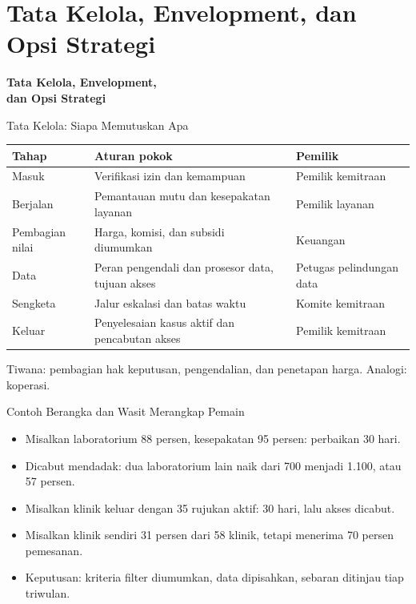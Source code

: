 \documentclass[aspectratio=169, table, 12pt]{beamer}
\begin{document}
\section{Tata Kelola, Envelopment, dan Opsi Strategi}

\begin{frame}{\hfill}
  \centering
  \Huge{\textbf{Tata Kelola, Envelopment,\\dan Opsi Strategi}}
\end{frame}

\begin{frame}{{\Large Tata Kelola: Siapa Memutuskan Apa}}
  \footnotesize
  \begin{tabularx}{\textwidth}{>{\raggedright\arraybackslash}p{2.7cm}
      >{\raggedright\arraybackslash}X >{\raggedright\arraybackslash}p{3.3cm}}
    \hline
    \textbf{Tahap} & \textbf{Aturan pokok} & \textbf{Pemilik} \\ \hline
    Masuk & Verifikasi izin dan kemampuan & Pemilik kemitraan \\ \hline
    Berjalan & Pemantauan mutu dan kesepakatan layanan & Pemilik layanan \\ \hline
    Pembagian nilai & Harga, komisi, dan subsidi diumumkan & Keuangan \\ \hline
    Data & Peran pengendali dan prosesor data, tujuan akses & Petugas pelindungan data \\ \hline
    Sengketa & Jalur eskalasi dan batas waktu & Komite kemitraan \\ \hline
    Keluar & Penyelesaian kasus aktif dan pencabutan akses & Pemilik kemitraan \\ \hline
  \end{tabularx}

  \vspace{8pt}
  \small Tiwana: pembagian hak keputusan, pengendalian, dan penetapan harga. Analogi: koperasi.
\end{frame}

\begin{frame}{{\Large Contoh Berangka dan Wasit Merangkap Pemain}}
  \vspace{10pt}
  \begin{itemize}
    \item Misalkan laboratorium 88 persen, kesepakatan 95 persen: perbaikan 30 hari.
    \item Dicabut mendadak: dua laboratorium lain naik dari 700 menjadi 1.100, atau 57 persen.
    \item Misalkan klinik keluar dengan 35 rujukan aktif: 30 hari, lalu akses dicabut.
    \item Misalkan klinik sendiri 31 persen dari 58 klinik, tetapi menerima 70 persen pemesanan.
    \item Keputusan: kriteria filter diumumkan, data dipisahkan, sebaran ditinjau tiap triwulan.
  \end{itemize}
\end{frame}
\end{document}
